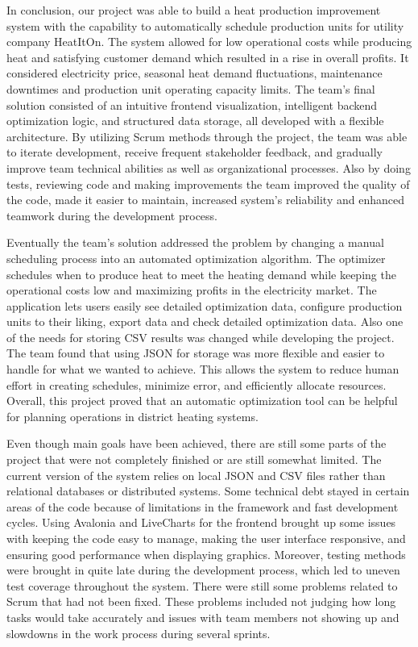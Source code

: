 In conclusion, our project was able to build a heat production improvement system with the capability to automatically schedule production units for utility company HeatItOn. The system allowed for low operational costs while producing heat and satisfying customer demand which resulted in a rise in overall profits. It considered electricity price, seasonal heat demand fluctuations, maintenance downtimes and production unit operating capacity limits. The team's final solution consisted of an intuitive frontend visualization, intelligent backend optimization logic, and structured data storage, all developed with a flexible architecture. By utilizing Scrum methods through the project, the team was able to iterate development, receive frequent stakeholder feedback, and gradually improve team technical abilities as well as organizational processes. Also by doing tests, reviewing code and making improvements the team improved the quality of the code, made it easier to maintain, increased system's reliability and enhanced teamwork during the development process.\par

Eventually the team's solution addressed the problem by changing a manual scheduling process into an automated optimization algorithm. The optimizer schedules when to produce heat to meet the heating demand while keeping the operational costs low and maximizing profits in the electricity market. The application lets users easily see detailed optimization data, configure production units to their liking, export data and check detailed optimization data. Also one of the needs for storing CSV results was changed while developing the project. The team found that using JSON for storage was more flexible and easier to handle for what we wanted to achieve. This allows the system to reduce human effort in creating schedules, minimize error, and efficiently allocate resources. Overall, this project proved that an automatic optimization tool can be helpful for planning operations in district heating systems.\par

Even though main goals have been achieved, there are still some parts of the project that were not completely finished or are still somewhat limited. The current version of the system relies on local JSON and CSV files rather than relational databases or distributed systems. Some technical debt stayed in certain areas of the code because of limitations in the framework and fast development cycles. Using Avalonia and LiveCharts for the frontend brought up some issues with keeping the code easy to manage, making the user interface responsive, and ensuring good performance when displaying graphics. Moreover, testing methods were brought in quite late during the development process, which led to uneven test coverage throughout the system. There were still some problems related to Scrum that had not been fixed. These problems included not judging how long tasks would take accurately and issues with team members not showing up and slowdowns in the work process during several sprints.\par

